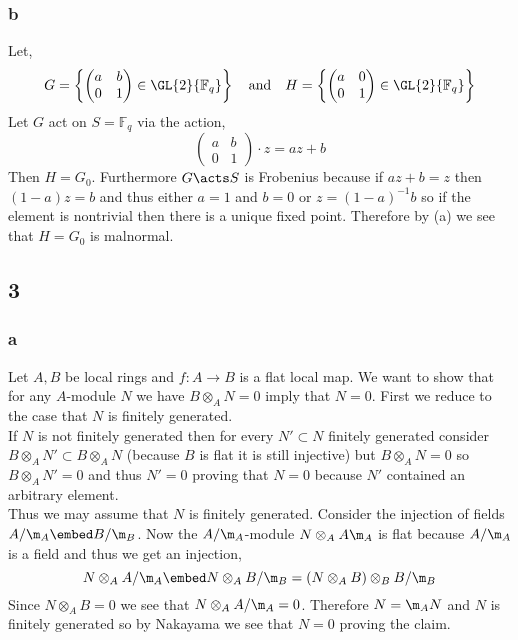 \documentclass[12pt]{article}
\renewcommand{\F}{\mathbb{F}}
\begin{document}
\subsubsection{b}

Let,
\[ G = \left\{ \begin{pmatrix}
a & b 
\\
0 & 1 
\end{pmatrix} \in \GL{2}{\F_q} \right\} \quad \text{and} \quad H = \left \{ 
\begin{pmatrix}
a & 0 
\\
0 & 1
\end{pmatrix} \in \GL{2}{\F_q} \right\} \]
Let $G$ act on $S = \F_q$ via the action,
\[ \begin{pmatrix}
a & b 
\\
0 & 1
\end{pmatrix}
\cdot z = a z + b \]
Then $H = G_0$. Furthermore $G \acts S$ is Frobenius because if $a z + b = z$ then $(1 - a)z = b$ and thus either $a = 1$ and $b = 0$ or $z = (1 - a)^{-1} b$ so if the element is nontrivial then there is a unique fixed point. Therefore by (a) we see that $H = G_0$ is malnormal. 

\subsection{3}

\subsubsection{a}

Let $A, B$ be local rings and $f : A \to B$ is a flat local map. We want to show that for any $A$-module $N$ we have $B \otimes_A N = 0$ imply that $N = 0$. First we reduce to the case that $N$ is finitely generated.
\bigskip\\
If $N$ is not finitely generated then for every $N' \subset N$ finitely generated consider $B \otimes_A N' \subset B \otimes_A N$ (because $B$ is flat it is still injective) but $B \otimes_A N = 0$ so $B \otimes_A N' = 0$ and thus $N' = 0$ proving that $N = 0$ because $N'$ contained an arbitrary element. 
\bigskip\\
Thus we may assume that $N$ is finitely generated. Consider the injection of fields $A / \m_A \embed B / \m_B$. Now the $A/ \m_A$-module $N \otimes_A A \m_A$ is flat because $A / \m_A$ is a field and thus we get an injection,
\[ N \otimes_A A / \m_A \embed N \otimes_A B / \m_B = (N \otimes_A B) \otimes_B B / \m_B \]
Since $N \otimes_A B = 0$ we see that $N \otimes_A A / \m_A = 0$. Therefore $N = \m_A N$ and $N$ is finitely generated so by Nakayama we see that $N = 0$ proving the claim.
\end{document}

